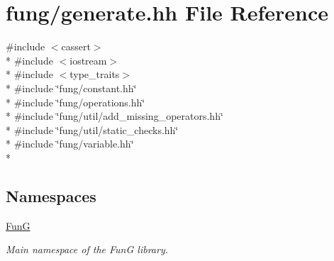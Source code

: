 \hypertarget{generate_8hh}{}\section{fung/generate.hh File Reference}
\label{generate_8hh}
{\ttfamily \#include $<$cassert$>$}\\*
{\ttfamily \#include $<$iostream$>$}\\*
{\ttfamily \#include $<$type\+\_\+traits$>$}\\*
{\ttfamily \#include \char`\"{}fung/constant.\+hh\char`\"{}}\\*
{\ttfamily \#include \char`\"{}fung/operations.\+hh\char`\"{}}\\*
{\ttfamily \#include \char`\"{}fung/util/add\+\_\+missing\+\_\+operators.\+hh\char`\"{}}\\*
{\ttfamily \#include \char`\"{}fung/util/static\+\_\+checks.\+hh\char`\"{}}\\*
{\ttfamily \#include \char`\"{}fung/variable.\+hh\char`\"{}}\\*
\subsection*{Namespaces}
\begin{DoxyCompactItemize}
\item 
 \hyperlink{namespaceFunG}{Fun\+G}
\begin{DoxyCompactList}\small\item\em Main namespace of the Fun\+G library. \end{DoxyCompactList}\end{DoxyCompactItemize}
